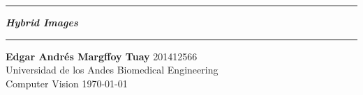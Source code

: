 \documentclass{article}
\newcommand{\squishlist}{
 \begin{list}{$\bullet$}
  { \setlength{\itemsep}{0pt}
     \setlength{\parsep}{3pt}
     \setlength{\topsep}{3pt}
     \setlength{\partopsep}{0pt}
     \setlength{\leftmargin}{1.5em}
     \setlength{\labelwidth}{1em}
     \setlength{\labelsep}{0.5em} } }
\newcommand{\squishend}{
  \end{list}  }
\begin{document}
 \def\maketitle{%
 \thispagestyle{plain}
 \vspace{-10ex}
 \hrule
 \bigskip
 \begin{center}
 {\Large{\textbf{\@title}}}
 \end{center}
 \bigskip
 \hrule

 \bigskip

 \begin{flushleft}
 \textbf{\normalsize{Edgar Andr\'{e}s Margffoy Tuay}} \hfill 201412566
 \\
 \vspace{5pt}
 Universidad de los Andes \hfill Biomedical Engineering
 \\
 \vspace{5pt}
 Computer Vision \vspace{5pt}
\hfill \today \\ 
 \end{flushleft}
 }
\def\title#1{\def\@title{#1}}
\title{\textit{Hybrid Images}}



\maketitle




\end{document}
